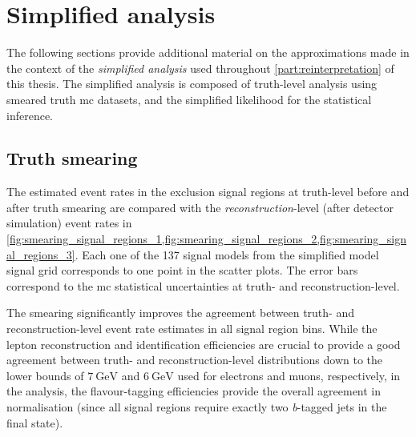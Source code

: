 
\chapter{Simplified analysis}


\ifpdf
\graphicspath{{chapter-pmssm/Figs/Raster/}{chapter-pmssm/Figs/PDF/}{chapter-pmssm/Figs/}}
\else
\graphicspath{{chapter-pmssm/Figs/Vector/}{chapter-pmssm/Figs/}}
\fi

The following sections provide additional material on the approximations made in the context of the \textit{simplified analysis} used throughout \cref{part:reinterpretation} of this thesis. The simplified analysis is composed of truth-level analysis using smeared truth \gls{mc} datasets, and the simplified likelihood for the statistical inference.

\section{Truth smearing}

The estimated event rates in the exclusion signal regions at truth-level before and after truth smearing are compared with the \textit{reconstruction}-level (\ie after detector simulation) event rates in \cref{fig:smearing_signal_regions_1,fig:smearing_signal_regions_2,fig:smearing_signal_regions_3}. Each one of the 137 signal models from the simplified model signal grid corresponds to one point in the scatter plots. The error bars correspond to the \gls{mc} statistical uncertainties at truth- and reconstruction-level.

The smearing significantly improves the agreement between truth- and reconstruction-level event rate estimates in all signal region bins. While the lepton reconstruction and identification efficiencies are crucial to provide a good agreement between truth- and reconstruction-level distributions down to the lower bounds of $\SI{7}{\GeV}$ and $\SI{6}{\GeV}$ used for electrons and muons, respectively, in the analysis, the flavour-tagging efficiencies provide the overall agreement in normalisation (since all signal regions require exactly two \textit{b}-tagged jets in the final state).

